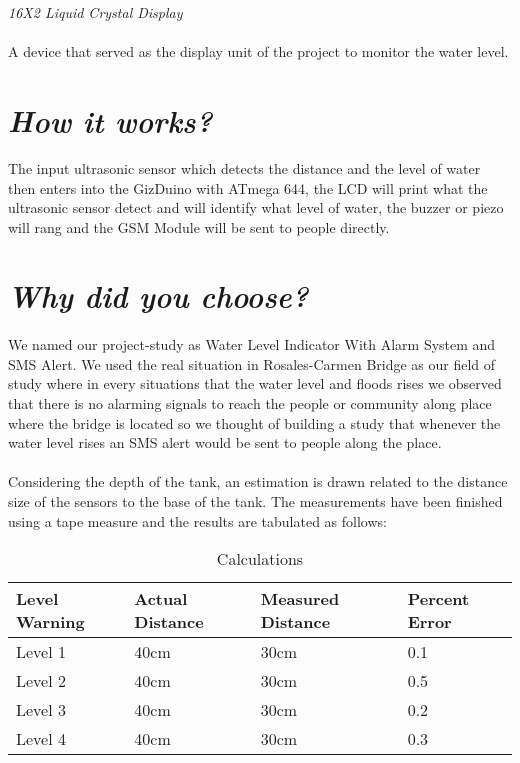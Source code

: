 \documentclass[11pt]{article}
\begin{document}
{ \textit {\Large 16X2 Liquid Crystal Display}
\paragraph{} {\Large A device that served as the display unit of the project to monitor the water level.}

\section{\emph{How it works?}}

The input ultrasonic sensor which detects the distance and the level of water then enters into the GizDuino with ATmega 644, the LCD will print what the ultrasonic sensor detect and will identify what level of water, the buzzer or piezo will rang and the GSM Module will be sent to people directly.


\section{\emph{Why did you choose?}}

\paragraph{} {\Large We named our project-study as Water Level Indicator With Alarm System and SMS Alert. We used the real situation in Rosales-Carmen Bridge as our field of study where in every situations that the water level and floods rises we observed that there is no alarming signals to reach the people or community along place where the bridge  is located so we thought of building a study that whenever the water level rises an SMS alert would be sent to people along the place. }

\paragraph{} {\Large Considering the depth of the tank, an estimation is drawn related to the distance size of the sensors to the base of the tank. The measurements have been finished using a tape measure and the results are tabulated as follows:}

\begin{table}[h!]
\begin{center}
\caption{Calculations}
\label{tab:table1}
\begin{tabular}{|l|l|l|l|}
      \hline
      \textbf{Level Warning} & \textbf{Actual Distance} & \textbf{Measured Distance} & \textbf{Percent Error}\\
      \hline Level 1 &40cm &30cm&0.1\\
      \hline Level 2 &40cm &30cm&0.5\\
      \hline Level 3 &40cm &30cm&0.2\\
      \hline Level 4 &40cm &30cm&0.3\\ 
      \hline
      

\end{tabular}
\end{center}
\end{table}}
\end{document}
